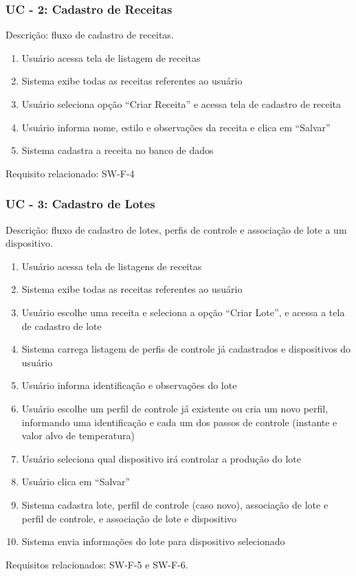 \subsubsection*{UC - 2: Cadastro de Receitas}
Descrição: fluxo de cadastro de receitas.
\begin{enumerate}
    \item Usuário acessa tela de listagem de receitas
    \item Sistema exibe todas as receitas referentes ao usuário
    \item Usuário seleciona opção “Criar Receita” e acessa tela de cadastro de receita
    \item Usuário informa nome, estilo e observações da receita e clica em “Salvar”
    \item Sistema cadastra a receita no banco de dados
\end{enumerate}
Requisito relacionado: SW-F-4

\subsubsection*{UC - 3: Cadastro de Lotes}
Descrição: fluxo de cadastro de lotes, perfis de controle e associação de lote a um dispositivo.
\begin{enumerate}
    \item Usuário acessa tela de listagens de receitas
    \item Sistema exibe todas as receitas referentes ao usuário
    \item Usuário escolhe uma receita e seleciona a opção “Criar Lote”, e acessa a tela de cadastro de lote
    \item Sistema carrega listagem de perfis de controle já cadastrados e dispositivos do usuário
    \item Usuário informa identificação e observações do lote
    \item Usuário escolhe um perfil de controle já existente ou cria um novo perfil, informando uma identificação e cada um dos passos de controle (instante e valor alvo de temperatura)
    \item Usuário seleciona qual dispositivo irá controlar a produção do lote
    \item Usuário clica em “Salvar”
    \item Sistema cadastra lote, perfil de controle (caso novo), associação de lote e perfil de controle, e associação de lote e dispositivo
    \item Sistema envia informações do lote para dispositivo selecionado
\end{enumerate}
Requisitos relacionados: SW-F-5 e SW-F-6.

